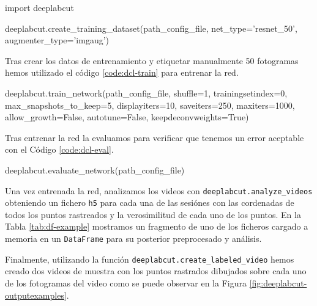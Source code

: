 \begin{mypython}[caption={Crear datos de entrenamiento de DeepLabCut.}, label={code:dcl-dataset}]
import deeplabcut

deeplabcut.create_training_dataset(path_config_file, 
                                   net_type='resnet_50',
                                   augmenter_type='imgaug')
\end{mypython}

Tras crear los datos de entrenamiento y etiquetar manualmente 50 fotogramas hemos utilizado el código \ref{code:dcl-train} para entrenar la red.

\begin{mypython}[caption={Entrenar la red de DeepLabCut.}, label={code:dcl-train}]
deeplabcut.train_network(path_config_file,
                         shuffle=1,
                         trainingsetindex=0,
                         max_snapshots_to_keep=5,
                         displayiters=10,
                         saveiters=250,
                         maxiters=1000,
                         allow_growth=False,
                         autotune=False,
                         keepdeconvweights=True)
\end{mypython}

Tras entrenar la red la evaluamos para verificar que tenemos un error aceptable con el Código \ref{code:dcl-eval}.

\begin{mypython}[caption={Evaluar la red de DeepLabCut.}, label={code:dcl-eval}]
deeplabcut.evaluate_network(path_config_file)
\end{mypython}

Una vez entrenada la red, analizamos los videos con \texttt{deeplabcut.analyze\_videos} obteniendo un fichero \texttt{h5} para cada una de las sesiónes con las cordenadas de todos los puntos rastreados y la verosimilitud de cada uno de los puntos. En la Tabla \ref{tab:df-example} mostramos un fragmento de uno de los ficheros cargado a memoria en un \texttt{DataFrame} para su posterior preprocesado y análisis.

Finalmente, utilizando la función \texttt{deeplabcut.create\_labeled\_video} hemos creado dos videos de muestra con los puntos rastrados dibujados sobre cada uno de los fotogramas del video como se puede observar en la Figura \ref{fig:deeplabcut-outputexamples}.

